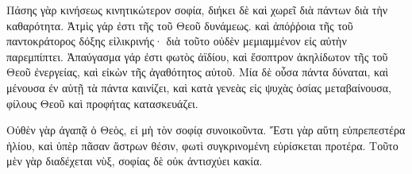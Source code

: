 {\par }{\PP {}Πάσης γὰρ κινήσεως κινητικώτερον σοφία, διήκει δὲ καὶ χωρεῖ διὰ πάντων διὰ τὴν καθαρότητα.
Ἀτμὶς γάρ ἐστι τῆς τοῦ Θεοῦ δυνάμεως. καὶ ἀπόῤῥοια τῆς τοῦ παντοκράτορος δόξης εἰλικρινής· διὰ τοῦτο οὐδὲν μεμιαμμένον εἰς αὐτὴν παρεμπίπτει.
Ἀπαύγασμα γάρ ἐστι φωτὸς ἀϊδίου, καὶ ἔσοπτρον ἀκηλίδωτον τῆς τοῦ Θεοῦ ἐνεργείας, καὶ εἰκὼν τῆς ἀγαθότητος αὐτοῦ.
Μία δὲ οὖσα πάντα δύναται, καὶ μένουσα ἐν αὑτῇ τὰ πάντα καινίζει, καὶ κατὰ γενεὰς εἰς ψυχὰς ὁσίας μεταβαίνουσα, φίλους Θεοῦ καὶ προφήτας κατασκευάζει.
\par }{\PP {}Οὐθὲν γὰρ ἀγαπᾷ ὁ Θεὸς, εἰ μὴ τὸν σοφίᾳ συνοικοῦντα.
Ἔστι γὰρ αὕτη εὐπρεπεστέρα ἡλίου, καὶ ὑπὲρ πᾶσαν ἄστρων θέσιν, φωτὶ συγκρινομένη εὑρίσκεται προτέρα.
Τοῦτο μὲν γὰρ διαδέχεται νὺξ, σοφίας δὲ οὐκ ἀντισχύει κακία.

}
